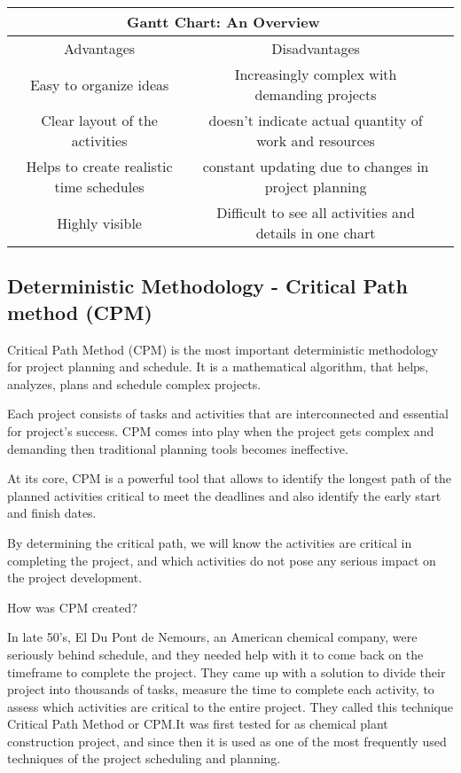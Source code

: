 \begin{tabular}{ |c|c|c| } 
	\hline
	\multicolumn{2}{|c|}{ Gantt Chart: An Overview} \\
	\hline
	Advantages & Disadvantages \\
	\hline
	Easy to organize ideas & Increasingly complex with demanding projects\\
	\hline
	Clear layout of the activities &  doesn't indicate actual quantity of work and resources \\
	\hline
	Helps to create realistic time schedules &constant updating due to changes in project planning \\
	\hline
	Highly visible  & Difficult to see all activities and details in one chart  \\
	\hline
\end{tabular}




\subsection{Deterministic Methodology - Critical Path method (CPM)}

Critical Path Method (CPM) is the most important deterministic methodology for project planning and schedule. It is a mathematical algorithm, that helps, analyzes, plans and schedule complex projects.

Each project consists of tasks and activities that are interconnected and essential for project’s success. CPM comes into play when the project gets complex and demanding then traditional planning tools becomes ineffective.

At its core, CPM is a powerful tool that allows to identify the longest path of the planned activities critical to meet the deadlines and also identify the early start and finish dates.

By determining the critical path, we will know the activities are critical in completing the project, and which activities do not pose any serious impact on the project development.

How was CPM created? 

In late 50's, El Du Pont de Nemours, an American chemical company, were seriously behind schedule, and they needed help with it to come back on the timeframe to complete the project. They came up with a solution to divide their project into thousands of tasks, measure the time to complete each activity, to assess which activities are critical to the entire project. They called this technique Critical Path Method or CPM.It was first tested for as chemical plant construction project, and since then it is used as one of the most frequently used techniques of the project scheduling and planning. 

